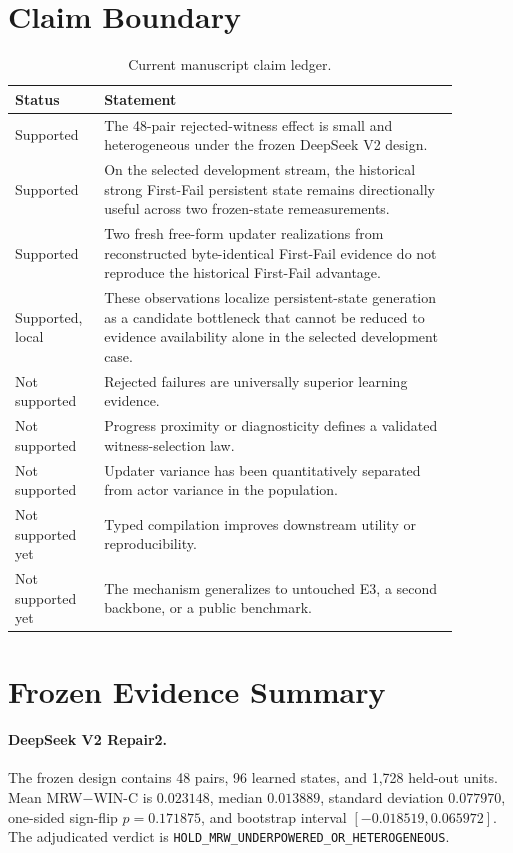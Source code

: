 \section{Claim Boundary}
\label{app:claims}

\begin{table}[h]
\centering
\caption{Current manuscript claim ledger.}
\small
\setlength{\tabcolsep}{3pt}
\begin{tabular}{p{0.16\linewidth}p{0.72\linewidth}}
\toprule
Status & Statement \\
\midrule
Supported & The 48-pair rejected-witness effect is small and heterogeneous under the frozen DeepSeek V2 design. \\
Supported & On the selected development stream, the historical strong First-Fail persistent state remains directionally useful across two frozen-state remeasurements. \\
Supported & Two fresh free-form updater realizations from reconstructed byte-identical First-Fail evidence do not reproduce the historical First-Fail advantage. \\
Supported, local & These observations localize persistent-state generation as a candidate bottleneck that cannot be reduced to evidence availability alone in the selected development case. \\
Not supported & Rejected failures are universally superior learning evidence. \\
Not supported & Progress proximity or diagnosticity defines a validated witness-selection law. \\
Not supported & Updater variance has been quantitatively separated from actor variance in the population. \\
Not supported yet & Typed compilation improves downstream utility or reproducibility. \\
Not supported yet & The mechanism generalizes to untouched E3, a second backbone, or a public benchmark. \\
\bottomrule
\end{tabular}
\end{table}

\section{Frozen Evidence Summary}
\label{app:evidence}

\paragraph{DeepSeek V2 Repair2.}
The frozen design contains 48 pairs, 96 learned states, and 1,728 held-out units. Mean MRW$-$WIN-C is $0.023148$, median $0.013889$, standard deviation $0.077970$, one-sided sign-flip $p=0.171875$, and bootstrap interval $[-0.018519,0.065972]$. The adjudicated verdict is \texttt{HOLD\_MRW\_UNDERPOWERED\_OR\_HETEROGENEOUS}.

